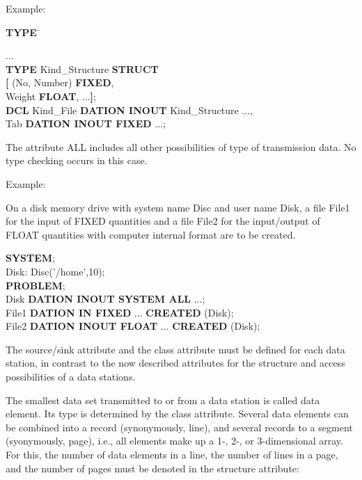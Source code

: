 Example:

\begin{tabbing}
{\bf TYPE} \= \kill

...        \> \\
{\bf TYPE} \> Kind\_Structure {\bf STRUCT} \\
    \> {\bf [} (No, Number) {\bf FIXED},\\
    \> \x Weight {\bf FLOAT}, ...{\bf ]};\\
{\bf DCL}  \> Kind\_File {\bf DATION INOUT} Kind\_Structure ...,\\
    \> Tab {\bf DATION INOUT FIXED} ...;
\end{tabbing}

The attribute ALL includes all other possibilities of type of
transmission data.
No type checking occurs in this case.

Example:

On a disk memory drive with system name
Disc
  and user name Disk, a file
File1 for the input of FIXED quantities and a file File2 for the
input/output of FLOAT quantities with computer internal format are to be
created.

{\bf SYSTEM};\\
\x Disk: Disc('/home',10);\\
{\bf PROBLEM};\\
 Disk {\bf DATION INOUT SYSTEM ALL} ...;\\
 File1 {\bf DATION IN FIXED} ... {\bf CREATED} (Disk);\\
 File2 {\bf DATION INOUT FLOAT} ... {\bf CREATED} (Disk);

The source/sink attribute and the class attribute must be defined for
each data station, in contrast to the now described attributes for the
structure and access possibilities of a data stations.

The smallest data set transmitted to or from a data station is called
data element. Its type is determined by the class attribute. Several
data elements can be combined into a record (synonymously, line), and
several records to a segment (syonymously, page), i.e., all elements
make up a 1-, 2-, or 3-dimensional array. For this, the number of data
elements in a line, the number of lines in a page, and the number of
pages must be denoted in the structure attribute:

